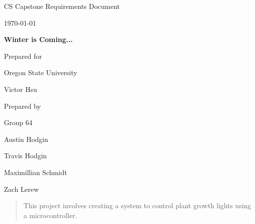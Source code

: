 \documentclass[onecolumn, draftclsnofoot,10pt, compsoc]{IEEEtran}
\def \CapstoneTeamName{			              The Party Parrots}
\def \CapstoneTeamNumber{					            64}
\def \GroupMemberOne{				            Austin Hodgin}
\def \GroupMemberTwo{				            Travis Hodgin}
\def \GroupMemberThree{			            Maximillian Schmidt}
\def\GroupMemberFour{		        	                Zach Lerew}
\def \CapstoneProjectName{	      	             Winter is Coming...}
\def \CapstoneSponsorCompany{		      Oregon State University }
\def \CapstoneSponsorPerson{		 			  Victor Hsu}
\def \DocType{		%
				Requirements Document
				}
\newcommand{\NameSigPair}[1]{\par
\makebox[2.75in][r]{#1} \hfil 	\makebox[3.25in]{\makebox[2.25in]{\hrulefill} \hfill		\makebox[.75in]{\hrulefill}}
\par\vspace{-12pt} \textit{\tiny\noindent
\makebox[2.75in]{} \hfil		\makebox[3.25in]{\makebox[2.25in][r]{Signature} \hfill	\makebox[.75in][r]{Date}}}}
\renewcommand{\NameSigPair}[1]{#1}
\begin{document}
\begin{titlepage}
    \begin{singlespace}
        \hfill
        \par\vspace{.2in}
        \centering
        \scshape{
            \huge CS Capstone \DocType \par
            {\large\today}\par
            \vspace{.5in}
            \textbf{\Huge\CapstoneProjectName}\par
						\vspace{1in}
            {\large Prepared for}\par
            \Huge \CapstoneSponsorCompany\par
            \vspace{5pt}
            {\Large\NameSigPair{\CapstoneSponsorPerson}\par}
            {\large Prepared by }\par
            Group\CapstoneTeamNumber\par
            \vspace{5pt}
            {\Large
                \NameSigPair{\GroupMemberOne}\par
            	 \NameSigPair{\GroupMemberTwo}\par
                 \NameSigPair{\GroupMemberThree}\par
		 \NameSigPair{\GroupMemberFour}\par

            }
            \vspace{20pt}
        }
				\vspace{2in}
        \begin{abstract}
				\noindent This project involves creating a system to control plant growth lights using a microcontroller.
        \end{abstract}
    \end{singlespace}
\end{titlepage}

\newpage
\end{document}
